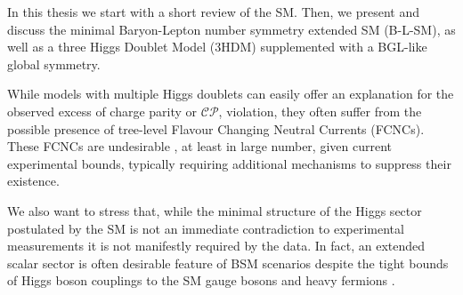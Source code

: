 \documentclass[10pt]{book}
\renewcommand{\(}{\left(}
\renewcommand{\)}{\right)}
\renewcommand{\[}{\left[}
\renewcommand{\]}{\right]}
\begin{document}

In this thesis we start with a short review of the SM. Then, we present and discuss the minimal Baryon-Lepton number symmetry extended SM (B-L-SM), as well as a three Higgs Doublet Model (3HDM) supplemented with a BGL-like global symmetry. 

%
%
%

While models with multiple Higgs doublets can easily offer an explanation for the observed excess of charge parity or $\mathcal{CP}$, violation, they often suffer from the possible presence of tree-level Flavour Changing Neutral Currents (FCNCs). 
%
These FCNCs are undesirable \cite{ILYUSHIN2020114921}, at least in large number, given current experimental bounds, typically requiring additional mechanisms to suppress their existence. 



We also want to stress that, while the minimal structure of the Higgs sector postulated by the SM is not an immediate contradiction to experimental measurements it is not manifestly required by the data. 
%
In fact, an extended scalar sector is often desirable feature of BSM scenarios despite the tight bounds of Higgs boson couplings to the SM gauge bosons and heavy fermions \cite{10.1093/ptep/ptaa104}. 
\end{document}
